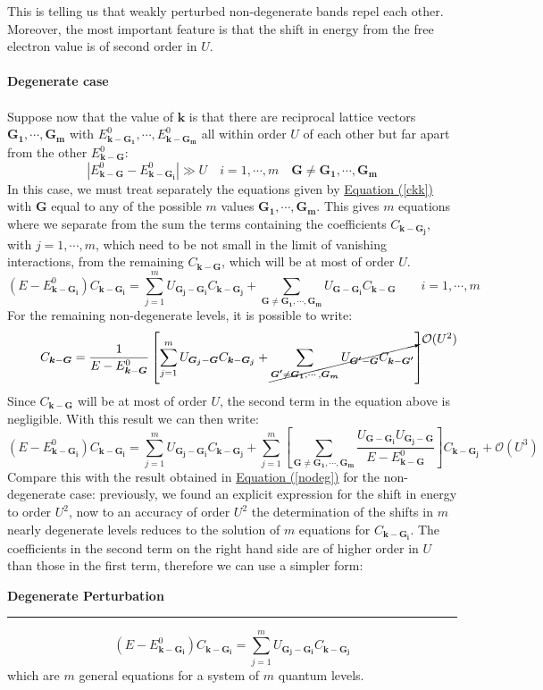 \documentclass[10.75pt,a4paper,openright,bottom=2cm]{article}
\renewcommand{\Vec}[1]{\boldsymbol{#1}}
\renewcommand{\refeq}[1]{\hyperref[#1]{Equation (\ref{#1})}}
\begin{document}
This is telling us that weakly perturbed non-degenerate bands repel each other. Moreover, the most important feature is that the shift in energy from the free electron value is of second order in $U$.\\\\
\textbf{Degenerate case}\\\\
Suppose now that the value of $\Vec{k}$ is that there are reciprocal lattice vectors $\Vec{G_1},\cdots, \Vec{G_m}$ with $E^0_{\Vec{k}-\Vec{G_1}},\cdots,E^0_{\Vec{k}-\Vec{G_m}}$ all within order $U$ of each other but far apart from the other $E^0_{\Vec{k}-\Vec{G}}$:
\[
|E^0_{\Vec{k}-\Vec{G}}-E^0_{\Vec{k}-\Vec{G_i}}|\gg U \quad i=1,\cdots,m \quad \Vec{G}\neq\Vec{G_1},\cdots,\Vec{G_m}
\]
In this case, we must treat separately the equations given by \refeq{ckk} with $\Vec{G}$ equal to any of the possible $m$ values $\Vec{G_1},\cdots,\Vec{G_m}$. This gives $m$ equations where we separate from the sum the terms containing the coefficients $C_{\Vec{k}-\Vec{G_j}}$, with $j=1,\cdots,m$, which need to be not small in the limit of vanishing interactions, from the remaining $C_{\Vec{k}-\Vec{G}}$, which will be at most of order $U$.
\[
(E-E^0_{\Vec{k}-\Vec{G_i}})C_{\Vec{k}-\Vec{G_i}}=\sum_{j=1}^mU_{\Vec{G_j}-\Vec{G_i}}C_{\Vec{k}-\Vec{G_j}}+\sum_{\Vec{G}\neq\Vec{G_1},\cdots,\Vec{G_m}}U_{\Vec{G}-\Vec{G_i}}C_{\Vec{k}-\Vec{G}} \qquad i=1,\cdots,m
\]
For the remaining non-degenerate levels, it is possible to write:
\[
C_{\Vec{k}-\Vec{G}}=\frac{1}{E-E^0_{\Vec{k}-\Vec{G}}}\left[\sum_{j=1}^mU_{\Vec{G_j}-\Vec{G}}C_{\Vec{k}-\Vec{G_j}}+\cancelto{\mathcal{O}(U^2)}{\sum_{\Vec{G'}\neq\Vec{G_1},\cdots,\Vec{G_m}}U_{\Vec{G'}-\Vec{G}}C_{\Vec{k}-\Vec{G'}}}\right]
\]
Since $C_{\Vec{k}-\Vec{G}}$ will be at most of order $U$, the second term in the equation above is negligible. With this result we can then write:
\[
(E-E^0_{\Vec{k}-\Vec{G_i}})C_{\Vec{k}-\Vec{G_i}}=\sum_{j=1}^mU_{\Vec{G_j}-\Vec{G_i}}C_{\Vec{k}-\Vec{G_j}}+\sum_{j=1}^m\left[\sum_{\Vec{G}\neq\Vec{G_1},\cdots,\Vec{G_m}}\frac{U_{\Vec{G}-\Vec{G_i}}U_{\Vec{G_j}-\Vec{G}}}{E-E^0_{\Vec{k}-\Vec{G}}}\right]C_{\Vec{k}-\Vec{G_j}}+\mathcal{O}(U^3)
\]
Compare this with the result obtained in \refeq{nodeg} for the non-degenerate case: previously, we found an explicit expression for the shift in energy to order $U^2$, now to an accuracy of order $U^2$ the determination of the shifts in $m$ nearly degenerate levels reduces to the solution of $m$ equations for $C_{\Vec{k}-\Vec{G_i}}$. The coefficients in the second term on the right hand side are of higher order in $U$ than those in the first term, therefore we can use a simpler form:
\begin{mybox}
\textbf{Degenerate Perturbation}
\hrule
\vspace{0.2cm}
\[
(E-E^0_{\Vec{k}-\Vec{G_i}})C_{\Vec{k}-\Vec{G_i}}=\sum_{j=1}^mU_{\Vec{G_j}-\Vec{G_i}}C_{\Vec{k}-\Vec{G_j}}
\]
which are $m$ general equations for a system of $m$ quantum levels. 
\end{mybox}
\newpage
\end{document}
